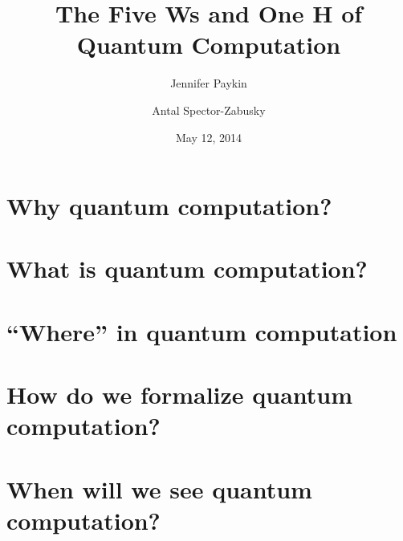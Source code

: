 \documentclass[12pt]{amsart}
\title{The Five Ws and One H of Quantum Computation}
\author{Jennifer Paykin \and Antal Spector-Zabusky}
\date{May 12, 2014}
\begin{document}
\maketitle

\section{Why quantum computation?}\label{sec:why}


\section{What is quantum computation?}\label{sec:what}


\section{``Where'' in quantum computation}\label{sec:where}


\section{How do we formalize quantum computation?}\label{sec:how}


\section{When will we see quantum computation?}\label{sec:when}


\def\refname{Who's who in quantum computation}


\end{document}
